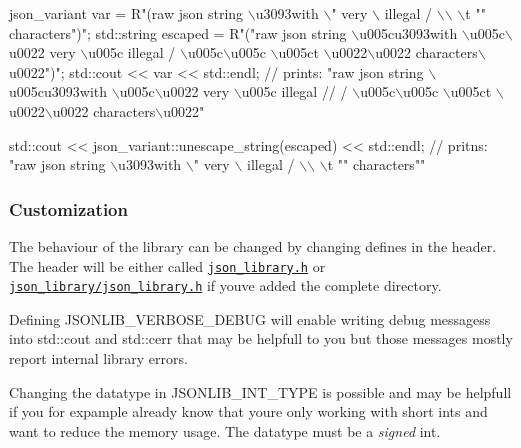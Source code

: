 \begin{DoxyCode}
json\_variant var = R\textcolor{stringliteral}{"(raw json string \(\backslash\)u3093with \(\backslash\)" very \(\backslash\) }
\textcolor{stringliteral}{                      illegal / \(\backslash\)\(\backslash\) \(\backslash\)t "" characters")";}
\textcolor{stringliteral}{}
\textcolor{stringliteral}{std::string escaped = R}\textcolor{stringliteral}{"("raw json string \(\backslash\)u005cu3093with \(\backslash\)u005c\(\backslash\)u0022 very }
\textcolor{stringliteral}{                          \(\backslash\)u005c illegal / \(\backslash\)u005c\(\backslash\)u005c \(\backslash\)u005ct \(\backslash\)u0022\(\backslash\)u0022 }
\textcolor{stringliteral}{                          characters\(\backslash\)u0022")";}
\textcolor{stringliteral}{}
\textcolor{stringliteral}{std::cout << var << std::endl;}
\textcolor{stringliteral}{}\textcolor{comment}{// prints: "raw json string \(\backslash\)u005cu3093with \(\backslash\)u005c\(\backslash\)u0022 very \(\backslash\)u005c illegal }
\textcolor{comment}{//          / \(\backslash\)u005c\(\backslash\)u005c \(\backslash\)u005ct \(\backslash\)u0022\(\backslash\)u0022 characters\(\backslash\)u0022"}

std::cout << json\_variant::unescape\_string(escaped) << std::endl;
\textcolor{comment}{// pritns: "raw json string \(\backslash\)u3093with \(\backslash\)" very \(\backslash\) illegal / \(\backslash\)\(\backslash\) \(\backslash\)t "" characters""}
\end{DoxyCode}


\subsubsection*{\label{_customization_section}%
Customization}

The behaviour of the library can be changed by changing defines in the header. The header will be either called \href{https://github.com/n0dex/cppjsonlib/blob/master/json_library.h}{\tt json\+\_\+library.\+h} or \href{https://github.com/n0dex/cppjsonlib/blob/master/json_library_source/json_library.h}{\tt json\+\_\+library/json\+\_\+library.\+h} if you\textquotesingle{}ve added the complete directory.


\begin{DoxyItemize}
\item Defining {\ttfamily J\+S\+O\+N\+L\+I\+B\+\_\+\+V\+E\+R\+B\+O\+S\+E\+\_\+\+D\+E\+B\+UG} will enable writing debug messagess into {\ttfamily std\+::cout} and {\ttfamily std\+::cerr} that may be helpfull to you but those messages mostly report internal library errors.
\item Changing the datatype in {\ttfamily J\+S\+O\+N\+L\+I\+B\+\_\+\+I\+N\+T\+\_\+\+T\+Y\+PE} is possible and may be helpfull if you for expample already know that youre only working with short ints and want to reduce the memory usage. The datatype must be a {\itshape signed} int.
\end{DoxyItemize}

